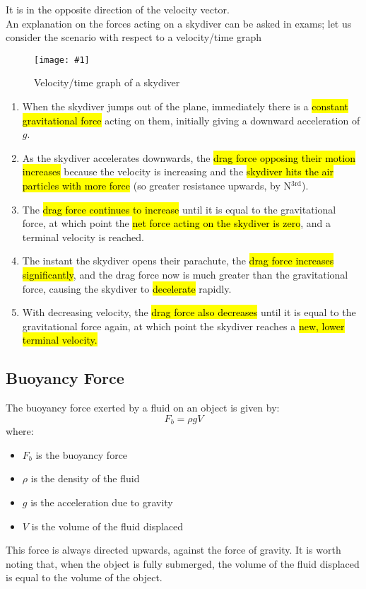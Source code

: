 \documentclass[a4paper,12pt]{article}
\newcommand{\lb}{\\[8pt]}
\newcommand{\img}[4]{\begin{center}
  \begin{figure}[H]
    \centering
    \texttt{[image: \#1]}
    \caption{#3}
    \label{fig:#4}
  \end{figure}
\end{center}}
\begin{document}
It is in the opposite direction of the velocity vector.\lb
An explanation on the forces acting on a skydiver can be asked in exams; let us consider the scenario with respect to a velocity/time graph
\img{material/terminalvgraph.png}{0.75}{Velocity/time graph of a skydiver}{skydiver}

\begin{enumerate}
  \item When the skydiver jumps out of the plane, immediately there is a \hl{constant gravitational force} acting on them, initially giving a downward acceleration of $g$.
  \item As the skydiver accelerates downwards, the \hl{drag force opposing their motion increases} because the velocity is increasing and the \hl{skydiver hits the air particles with more force} (so greater resistance upwards, by N$^{3\text{rd}}$).
  \item The \hl{drag force continues to increase} until it is equal to the gravitational force, at which point the \hl{net force acting on the skydiver is zero}, and a terminal velocity is reached.
  \item The instant the skydiver opens their parachute, the \hl{drag force increases significantly}, and the drag force now is much greater than the gravitational force, causing the skydiver to \hl{decelerate} rapidly.
  \item With decreasing velocity, the \hl{drag force also decreases} until it is equal to the gravitational force again, at which point the skydiver reaches a \hl{new, lower terminal velocity.}
\end{enumerate}

\pagebreak

\subsection{Buoyancy Force}

The buoyancy force exerted by a fluid on an object is given by:
$$F_b = \rho g V$$
where:
\begin{itemize}
  \item $F_b$ is the buoyancy force
  \item $\rho$ is the density of the fluid
  \item $g$ is the acceleration due to gravity
  \item $V$ is the volume of the fluid displaced
\end{itemize}

This force is always directed upwards, against the force of gravity. It is worth noting that, when the object is fully submerged, the volume of the fluid displaced is equal to the volume of the object.
\end{document}
